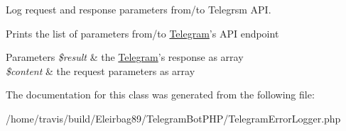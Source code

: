 Log request and response parameters from/to Telegrsm A\-P\-I. 

Prints the list of parameters from/to \hyperlink{class_telegram}{Telegram}'s A\-P\-I endpoint 
\begin{DoxyParams}{Parameters}
{\em \$result} & the \hyperlink{class_telegram}{Telegram}'s response as array \\
\hline
{\em \$content} & the request parameters as array \\
\hline
\end{DoxyParams}


The documentation for this class was generated from the following file\-:\begin{DoxyCompactItemize}
\item 
/home/travis/build/\-Eleirbag89/\-Telegram\-Bot\-P\-H\-P/Telegram\-Error\-Logger.\-php\end{DoxyCompactItemize}
